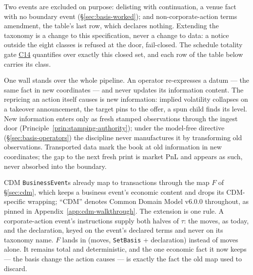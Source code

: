 Two events are excluded
on purpose: delisting with continuation, a venue fact with no boundary event
(\S\ref{sec:basis-worked}); and non-corporate-action terms amendment, the
table's last row, which declares nothing. Extending the taxonomy is a change
to this specification, never a change to data: a notice outside the eight
classes is refused at the door, fail-closed. The schedule totality gate
\hyperref[cond:C14]{C14} quantifies over exactly this closed set, and each
row of the table below carries its class.

One wall stands over the whole pipeline. An operator re-expresses a datum ---
the same fact in new coordinates --- and never updates its information
content. The repricing an action itself causes is new information: implied
volatility collapses on a takeover announcement, the target pins to the
offer, a spun child finds its level. New information enters only as fresh
stamped observations through the ingest door
(Principle~\ref{prin:stamping-authority}); under the model-free directive
(\S\ref{sec:basis-operators}) the discipline never manufactures it by
transforming old observations. Transported data mark the book at old information in
new coordinates; the gap to the next fresh print is market PnL and appears
as such, never absorbed into the boundary.

CDM \texttt{BusinessEvent}s already map to transactions through the map $F$ of
\S\ref{sec:cdm}, which keeps a business event's economic content and drops its
CDM-specific wrapping; ``CDM'' denotes Common Domain Model v6.0.0 throughout, as pinned in
Appendix~\ref{app:cdm-walkthrough}. The extension is one rule. A corporate-action
event's instructions supply both halves of $\tau$: the moves, as today, and the
declaration, keyed on the event's declared terms and never on its taxonomy name. $F$
lands in (moves, \texttt{SetBasis} + declaration) instead of moves alone. It remains
total and deterministic, and the one economic fact it now keeps --- the basis change
the action causes --- is exactly the fact the old map used to discard.

